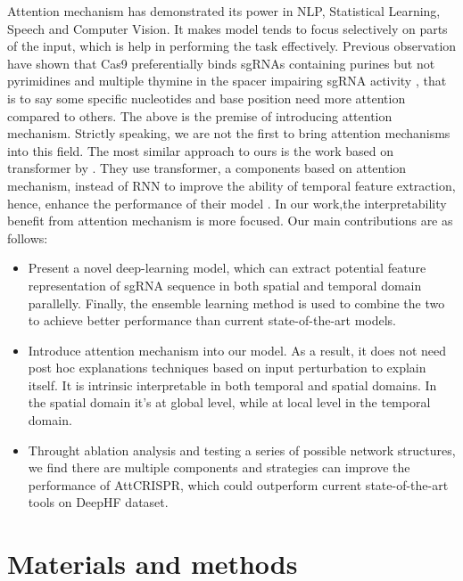 \documentclass{bioinfo}
\begin{document}
Attention mechanism has demonstrated its power in NLP, Statistical Learning, Speech and Computer Vision. 
 It makes model tends to focus selectively on parts of the input, which is help in performing the task effectively. 
 Previous observation have shown that Cas9 preferentially binds sgRNAs containing purines but not pyrimidines \citep{wang2014genetic} and multiple thymine in the spacer impairing sgRNA activity \citep{wu2014genome-wide}, 
 that is to say some specific nucleotides and base position need more attention compared to others. 
 The above is the premise of introducing attention mechanism. Strictly speaking, we are not the first to bring attention mechanisms into this field. 
 The most similar approach to ours is the work based on transformer by \citeauthor{Liu2019}. 
 They use transformer, a components based on attention mechanism, instead of RNN to improve the ability of temporal feature extraction, 
 hence, enhance the performance of their model \citep{vaswani2017attention,Liu2019}. 
 In our work,the interpretability benefit from attention mechanism is more focused. 
 Our main contributions are as follows:\vspace*{1pt}
\begin{itemize}
    \item Present a novel deep-learning model, which can extract potential feature representation of sgRNA sequence in both spatial and temporal domain parallelly. 
    Finally, the ensemble learning method is used to combine the two to achieve better performance than current state-of-the-art models. 
    \item Introduce attention mechanism into our model. 
    As a result, it does not need post hoc explanations techniques based on input perturbation to explain itself. 
    It is intrinsic interpretable in both temporal and spatial domains.
    In the spatial domain it's at global level, while at local level in the temporal domain. 
    \item Throught ablation analysis and testing a series of possible network structures, 
    we find there are multiple components and strategies can improve the performance of AttCRISPR, 
    which could outperform current state-of-the-art tools on DeepHF dataset.\vspace*{1pt}
\end{itemize}

\section{Materials and methods}
\end{document}
